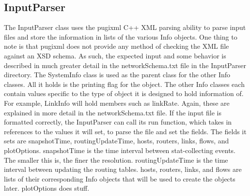 \subsection{InputParser}
    The InputParser class uses the pugixml C++ XML parsing ability to parse input files and store the information in lists of the various Info objects. One thing to note is that pugixml does not provide any method of checking the XML file against an XSD schema. As such, the expected input and some behavior is described in much greater detail in the networkSchema.txt file in the InputParser directory.
    The SystemInfo class is used as the parent class for the other Info classes. All it holds is the printing flag for the object. The other Info classes each contain values specific to the type of object it is designed to hold information of. For example, LinkInfo will hold members such as linkRate. Again, these are explained in more detail in the networkSchema.txt file.
If the input file is formatted correctly, the InputParser can call its run function, which takes in references to the values it will set, to parse the file and set the fields. The fields it sets are snapshotTime, routingUpdateTime, hosts, routers, links, flows, and plotOptions. snapshotTime is the time interval between stat-collecting events. The smaller this is, the finer the resolution. routingUpdateTime is the time interval between updating the routing tables. hosts, routers, links, and flows are lists of their corresponding Info objects that will be used to create the objects later. plotOptions does stuff.

